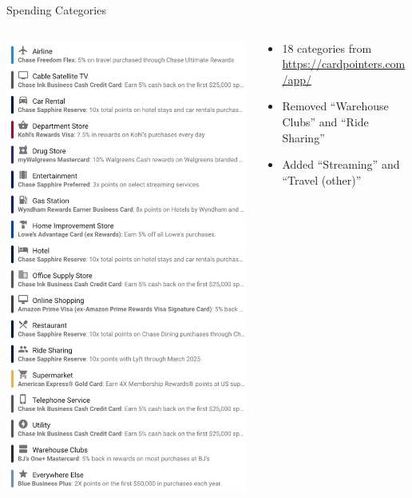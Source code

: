 \begin{frame}{Spending Categories}
    \begin{columns}[c]
        \begin{column}{0.4\textwidth}
            \includegraphics[scale=0.3]{../Misc/CardPointersCategories.png}
        \end{column}
        \begin{column}{0.6\textwidth}
            \begin{itemize}
                \item 18 categories from \url{https://cardpointers.com/app/}
                \item Removed ``Warehouse Clubs'' and ``Ride Sharing'' 
                \item Added ``Streaming'' and ``Travel (other)''
            \end{itemize}
        \end{column}
    \end{columns}
\end{frame}

